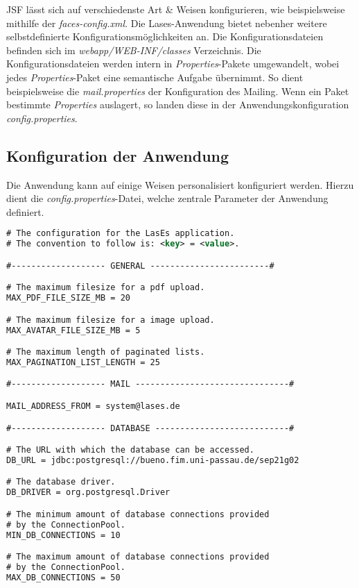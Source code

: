 
JSF lässt sich auf verschiedenste Art \& Weisen konfigurieren, wie beispielsweise
mithilfe der \emph{faces-config.xml}.
Die Lases-Anwendung bietet nebenher weitere selbstdefinierte Konfigurationsmöglichkeiten an.
Die Konfigurationsdateien befinden sich im \emph{webapp/WEB-INF/classes} Verzeichnis.
\newline\newline
Die Konfigurationsdateien werden intern in \emph{Properties}-Pakete umgewandelt,
wobei jedes \emph{Properties}-Paket eine semantische Aufgabe übernimmt.
So dient beispielsweise die \emph{mail.properties} der Konfiguration des Mailing.
Wenn ein Paket bestimmte \emph{Properties} auslagert,
so landen diese in der Anwendungskonfiguration \emph{config.properties}.

\subsection{Konfiguration der Anwendung}
Die Anwendung kann auf einige Weisen personalisiert konfiguriert werden.
Hierzu dient die \emph{config.properties}-Datei,
welche zentrale Parameter der Anwendung definiert.

\begin{lstlisting}[language=XML, caption = Die Anwendungskonfiguration \emph{config.properties}]
# The configuration for the LasEs application.
# The convention to follow is: <key> = <value>.

#------------------- GENERAL ------------------------#

# The maximum filesize for a pdf upload.
MAX_PDF_FILE_SIZE_MB = 20

# The maximum filesize for a image upload.
MAX_AVATAR_FILE_SIZE_MB = 5

# The maximum length of paginated lists.
MAX_PAGINATION_LIST_LENGTH = 25

#------------------- MAIL -------------------------------#

MAIL_ADDRESS_FROM = system@lases.de

#------------------- DATABASE ---------------------------#

# The URL with which the database can be accessed.
DB_URL = jdbc:postgresql://bueno.fim.uni-passau.de/sep21g02

# The database driver.
DB_DRIVER = org.postgresql.Driver

# The minimum amount of database connections provided
# by the ConnectionPool.
MIN_DB_CONNECTIONS = 10

# The maximum amount of database connections provided
# by the ConnectionPool.
MAX_DB_CONNECTIONS = 50
\end{lstlisting}

